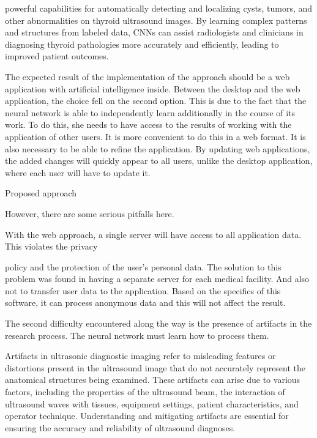 \documentclass{article}
\newcommand{\RomanNumeralCaps}[1]
    {\MakeUppercase{\romannumeral #1}}
\begin{document}
powerful capabilities for automatically detecting and localizing cysts, tumors, and other abnormalities on thyroid
ultrasound images. By learning complex patterns and
structures from labeled data, CNNs can assist radiologists
and clinicians in diagnosing thyroid pathologies more
accurately and efficiently, leading to improved patient
outcomes.
\par The expected result of the implementation of the
approach should be a web application with artificial
intelligence inside. Between the desktop and the web
application, the choice fell on the second option. This
is due to the fact that the neural network is able to
independently learn additionally in the course of its work.
To do this, she needs to have access to the results of
working with the application of other users. It is more
convenient to do this in a web format. It is also necessary
to be able to refine the application. By updating web
applications, the added changes will quickly appear to
all users, unlike the desktop application, where each user
will have to update it.

\vspace{0.16in}
\RomanNumeralCaps{5} Proposed approach
\vspace{0.16in}

\par However, there are some serious pitfalls here.
\par With the web approach, a single server will have
access to all application data. This violates the privacy

\newpage

\noindent policy and the protection of the user’s personal data. The
solution to this problem was found in having a separate
server for each medical facility. And also not to transfer
user data to the application. Based on the specifics of this
software, it can process anonymous data and this will not
affect the result.

\par The second difficulty encountered along the way is the
presence of artifacts in the research process. The neural
network must learn how to process them.

\par Artifacts in ultrasonic diagnostic imaging refer to misleading features or distortions present in the ultrasound
image that do not accurately represent the anatomical
structures being examined. These artifacts can arise
due to various factors, including the properties of the
ultrasound beam, the interaction of ultrasound waves
with tissues, equipment settings, patient characteristics,
and operator technique. Understanding and mitigating
artifacts are essential for ensuring the accuracy and
reliability of ultrasound diagnoses.
\end{document}
